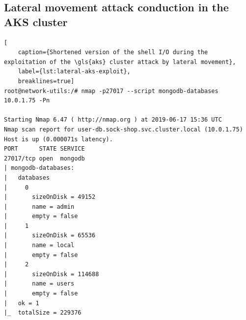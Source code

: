 \subsection{Lateral movement attack conduction in the AKS cluster}

\begin{lstlisting}[
	caption={Shortened version of the shell I/O during the exploitation of the \gls{aks} cluster attack by lateral movement},
	label={lst:lateral-aks-exploit},
	breaklines=true]
root@network-utils:/# nmap -p27017 --script mongodb-databases 10.0.1.75 -Pn

Starting Nmap 6.47 ( http://nmap.org ) at 2019-06-17 15:36 UTC
Nmap scan report for user-db.sock-shop.svc.cluster.local (10.0.1.75)
Host is up (0.000071s latency).
PORT      STATE SERVICE
27017/tcp open  mongodb
| mongodb-databases:
|   databases
|     0
|       sizeOnDisk = 49152
|       name = admin
|       empty = false
|     1
|       sizeOnDisk = 65536
|       name = local
|       empty = false
|     2
|       sizeOnDisk = 114688
|       name = users
|       empty = false
|   ok = 1
|_  totalSize = 229376


\end{lstlisting}
